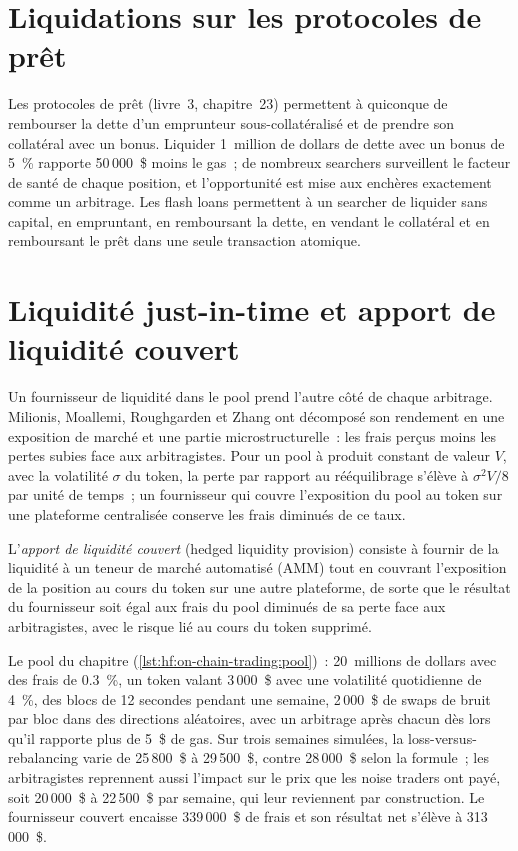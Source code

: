 \section{Liquidations sur les protocoles de prêt}

Les protocoles de prêt (livre~3, chapitre~23) permettent à quiconque de rembourser la dette d'un emprunteur sous-collatéralisé et de prendre son collatéral avec un bonus.
Liquider 1~million de dollars de dette avec un bonus de 5~\% rapporte 50\,000~\$ moins le gas~; de nombreux searchers surveillent le facteur de santé de chaque position, et
l'opportunité est mise aux enchères exactement comme un arbitrage. Les flash loans permettent à un searcher de liquider sans capital, en empruntant, en remboursant la dette, en vendant
le collatéral et en remboursant le prêt dans une seule transaction atomique.

\section{Liquidité just-in-time et apport de liquidité couvert}

Un fournisseur de liquidité dans le pool prend l'autre côté de chaque arbitrage. Milionis, Moallemi, Roughgarden et Zhang ont décomposé son rendement en une
exposition de marché et une partie microstructurelle~: les frais perçus moins les pertes subies face aux arbitragistes. Pour un pool à produit constant de valeur $V$, avec la
volatilité $\sigma$ du token, la perte par rapport au rééquilibrage s'élève à $\sigma^2V/8$ par unité de temps~; un fournisseur qui couvre l'exposition du pool au token sur une
plateforme centralisée conserve les frais diminués de ce taux.

\begin{definition}\label{def:hf:on-chain-trading:hedged}
L'\emph{apport de liquidité couvert} (hedged liquidity provision) consiste à fournir de la liquidité à un teneur de marché automatisé (AMM) tout en couvrant
l'exposition de la position au cours du token sur une autre plateforme, de sorte que le résultat du fournisseur soit égal aux frais du pool diminués de sa perte face aux arbitragistes, avec
le risque lié au cours du token supprimé.
\end{definition}

Le pool du chapitre (\cref{lst:hf:on-chain-trading:pool})~: 20~millions de dollars avec des frais de 0.3~\%, un token valant 3\,000~\$ avec une volatilité quotidienne de 4~\%, des blocs de 12 secondes
pendant une semaine, 2\,000~\$ de swaps de bruit par bloc dans des directions aléatoires, avec un arbitrage après chacun dès lors qu'il rapporte plus de 5~\$ de gas. Sur trois semaines simulées, la
loss-versus-rebalancing varie de 25\,800~\$ à 29\,500~\$, contre 28\,000~\$ selon la formule~; les arbitragistes reprennent aussi l'impact sur le prix que les noise traders
ont payé, soit 20\,000~\$ à 22\,500~\$ par semaine, qui leur reviennent par construction. Le fournisseur couvert encaisse 339\,000~\$ de frais et son résultat net s'élève à 313\,000~\$.

